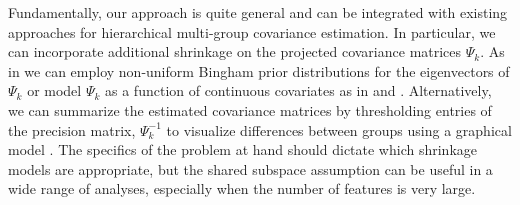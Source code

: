 \documentclass[12pt]{article}
\begin{document}

Fundamentally, our approach is quite general and can be integrated
with existing approaches for hierarchical multi-group covariance
estimation.  In particular, we can incorporate additional shrinkage on
the projected covariance matrices $\Psi_k$.  As in \citet{Hoff2009} we
can employ non-uniform Bingham prior distributions for the
eigenvectors of $\Psi_k$ or model $\Psi_k$ as a function of continuous
covariates as in \citet{Yin2010} and \citet{Hoff2011}.  Alternatively, we can
summarize the estimated covariance matrices by thresholding entries of
the precision matrix, $\Psi_k^{-1}$ to visualize differences between
groups using a graphical model \citep{Meinshausen2006}.  The specifics
of the problem at hand should dictate which shrinkage models are
appropriate, but the shared subspace assumption can be useful in a
wide range of analyses, especially when the number of features is very
large.





\end{document}
